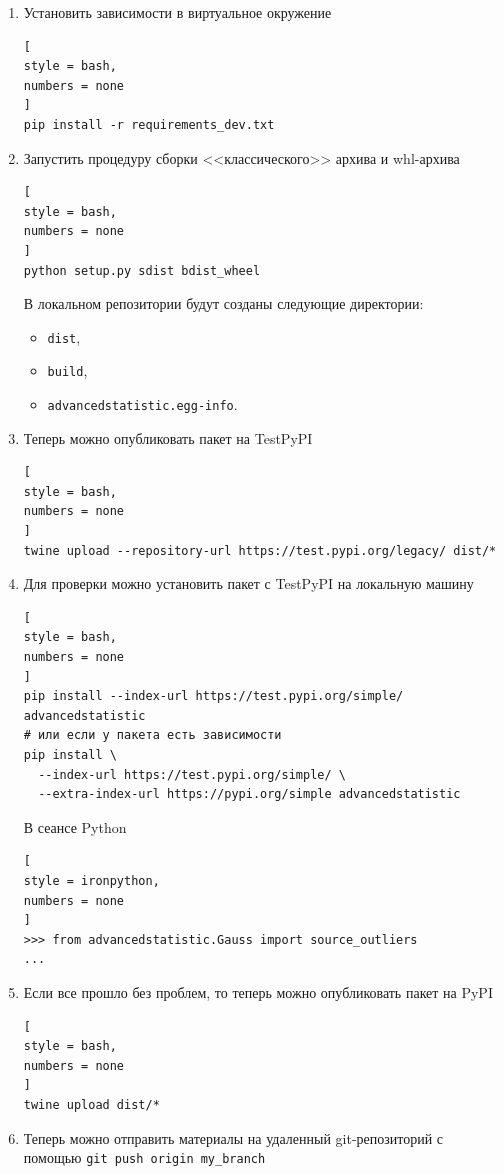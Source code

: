 \documentclass[%
	11pt,
	a4paper,
	utf8,
		]{article}
\begin{document}
\begin{enumerate}
    \item Установить зависимости в виртуальное окружение
\begin{lstlisting}[
style = bash,
numbers = none	
]
pip install -r requirements_dev.txt    
\end{lstlisting}

    \item Запустить процедуру сборки <<классического>> архива и whl-архива
\begin{lstlisting}[
style = bash,
numbers = none	
]
python setup.py sdist bdist_wheel
\end{lstlisting}

В локальном репозитории будут созданы следующие директории:
\begin{itemize}
	\item \texttt{dist},
	
	\item \texttt{build},
	
	\item \texttt{advancedstatistic.egg-info}.
\end{itemize}

    \item Теперь можно опубликовать пакет на TestPyPI
\begin{lstlisting}[
style = bash,
numbers = none	
]
twine upload --repository-url https://test.pypi.org/legacy/ dist/*
\end{lstlisting}

    \item Для проверки можно установить пакет с TestPyPI на локальную машину
\begin{lstlisting}[
style = bash,
numbers = none	
]
pip install --index-url https://test.pypi.org/simple/ advancedstatistic
# или если у пакета есть зависимости
pip install \
  --index-url https://test.pypi.org/simple/ \
  --extra-index-url https://pypi.org/simple advancedstatistic
\end{lstlisting}

В сеансе Python
\begin{lstlisting}[
style = ironpython,
numbers = none	
]
>>> from advancedstatistic.Gauss import source_outliers
...
\end{lstlisting}

    \item Если все прошло без проблем, то теперь можно опубликовать пакет на PyPI
\begin{lstlisting}[
style = bash,
numbers = none	
]
twine upload dist/*
\end{lstlisting}
    \item Теперь можно отправить материалы на удаленный git-репозиторий с помощью \texttt{git push origin my\_branch}
\end{enumerate}
\end{document}
